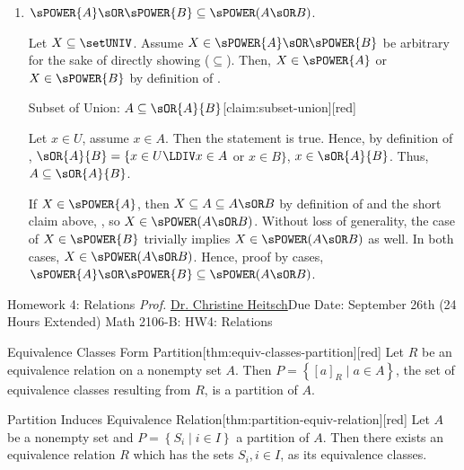 \begin{enumerate}
\begin{enumerate}
    \item $\sPOWER{A} \sOR \sPOWER{B} \subseteq \sPOWER(A \sOR B)$.
    \begin{subprove}
      Let $X \subseteq\setUNIV$. Assume $X\in\sPOWER{A} \sOR \sPOWER{B}$ be arbitrary for the sake of directly showing ($\subseteq$). 
      Then, $X \in \sPOWER{A}$ or $X \in \sPOWER{B}$ by definition of . 
      \begin{define}{Subset of Union: $A \subseteq \sOR{A}{B}$}[claim:subset-union][red]
        \begin{subprove}[red]
            Let $x\in U$, assume $x\in A$. Then the statement  is true.
            Hence, by definition of , $\sOR{A}{B}=\{x\in U\LDIV x\in A$ or $x\in B\}$, $x\in \sOR{A}{B}$.
            Thus, $A \subseteq \sOR{A}{B}$.
        \end{subprove}
      \end{define}
      If $X \in \sPOWER{A}$, then $X \subseteq A \subseteq A \sOR B$ by definition of  and the short claim above, , 
      so $X \in \sPOWER(A \sOR B)$.
      Without loss of generality, the case of $X \in \sPOWER{B}$ trivially implies $X \in \sPOWER(A \sOR B)$ as well. 
      In both cases, $X \in \sPOWER(A \sOR B)$. 
      Hence, proof by cases, $\sPOWER{A} \sOR \sPOWER{B} \subseteq \sPOWER(A \sOR B)$.
    \end{subprove}
  \end{enumerate}
\end{enumerate}





\newpage{}
{Homework 4: Relations}
{\textit{Prof.} \href{https://ceheitsch.github.io/webpage/}{Dr. Christine Heitsch}}{Due Date: September 26th (24 Hours Extended)}
{Math 2106-B: HW4: Relations}
\newpage







\begin{define}{Equivalence Classes Form Partition}[thm:equiv-classes-partition][red]
  Let $R$ be an equivalence relation on a nonempty set $A$. Then $P=\left\{[a]_R \mid a \in A\right\}$, the set of equivalence classes resulting from $R$, is a partition of $A$.
\end{define}
\begin{define}{Partition Induces Equivalence Relation}[thm:partition-equiv-relation][red]
  Let $A$ be a nonempty set and $P=\left\{S_i \mid i \in I\right\}$ a partition of $A$. Then there exists an equivalence relation $R$ which has the sets $S_i, i \in I$, as its equivalence classes.
\end{define}

